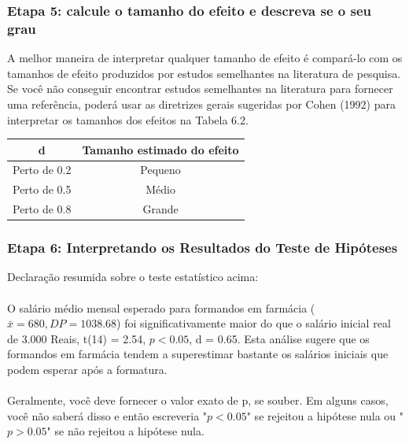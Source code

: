 \documentclass[11pt]{beamer}
\begin{document}
\begin{frame}
\frametitle{Etapa 5: calcule o tamanho do efeito e descreva se o seu grau}
A melhor maneira de interpretar qualquer tamanho de efeito é compará-lo com os tamanhos de efeito produzidos por estudos semelhantes na literatura de pesquisa. Se você não conseguir encontrar estudos semelhantes na literatura para fornecer uma referência, poderá usar as diretrizes gerais sugeridas por Cohen (1992) para interpretar os tamanhos dos efeitos na Tabela 6.2.

\begin{center}
\begin{tabular}{cc} 
 \hline
d  & Tamanho estimado do efeito\\
 \hline
Perto de 0.2 & Pequeno \\
Perto de 0.5 & Médio \\
Perto de 0.8 & Grande \\
 \hline
\end{tabular}
\end{center}   

\end{frame}

\begin{frame}
\frametitle{Etapa 6: Interpretando os Resultados do Teste de Hipóteses}

Declaração resumida sobre o teste estatístico acima:\\~\\

O salário médio mensal esperado para formandos em farmácia ($\bar{x} = 680, DP = 1038.68$) foi significativamente maior do que o salário inicial real de 3.000 Reais, t(14) = 2.54, \(p < 0.05\), d = 0.65. Esta análise sugere que os formandos em farmácia tendem a superestimar bastante os salários iniciais que podem esperar após a formatura.\\~\\

Geralmente, você deve fornecer o valor exato de p, se souber. Em alguns casos, você não saberá disso e então escreveria "\(p < 0.05\)" se rejeitou a hipótese nula ou "\(p > 0.05\)" se não rejeitou a hipótese nula.
\end{frame}
\end{document}
